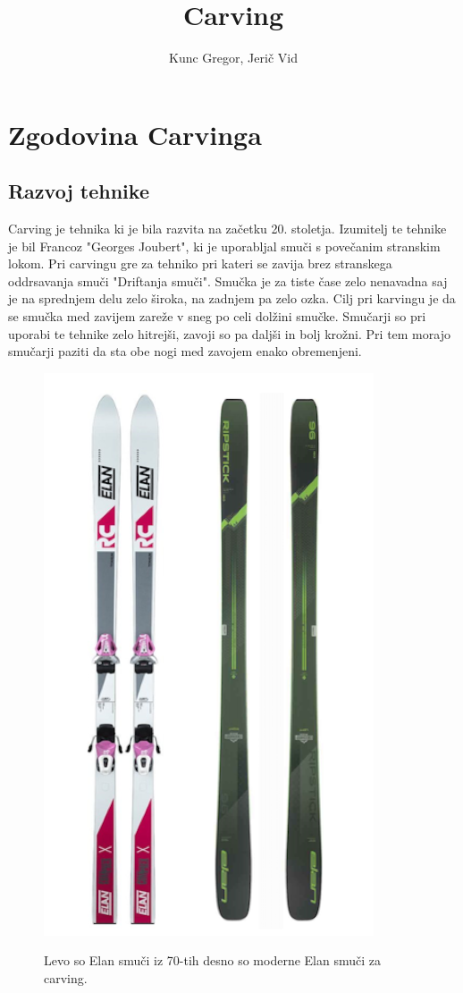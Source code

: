 \documentclass{article}
\title{Carving}
\author{Kunc Gregor, Jerič Vid}
\begin{document}
\maketitle

\section{Zgodovina Carvinga}

\subsection*{Razvoj tehnike}
Carving je tehnika ki je bila razvita na začetku 20. stoletja. Izumitelj te tehnike je bil Francoz "Georges Joubert", ki je uporabljal smuči s povečanim stranskim lokom.
Pri carvingu gre za tehniko pri kateri se zavija brez stranskega oddrsavanja smuči "Driftanja smuči".
Smučka je za tiste čase zelo nenavadna saj je na sprednjem delu zelo široka, na zadnjem pa zelo ozka.
Cilj pri karvingu je da se smučka med zavijem zareže v sneg po celi dolžini smučke. Smučarji so pri uporabi te tehnike zelo hitrejši, zavoji so pa daljši in bolj krožni. 
Pri tem morajo smučarji paziti da sta obe nogi med zavojem enako obremenjeni. 

\begin{figure}
    \centering
    \includegraphics[scale=0.3]{../images/elan smuci.png} \\
    \caption[short]{Levo so Elan smuči iz 70-tih desno so moderne Elan smuči za carving.}
\end{figure}
\end{document}
